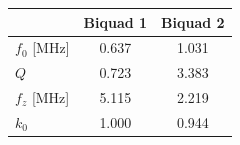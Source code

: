 \begin{tabular}{lcc}
\toprule
 & Biquad 1 & Biquad 2 \\
\midrule
$f_0$ [MHz] & 0.637 & 1.031 \\
$Q$ & 0.723 & 3.383 \\
$f_z$ [MHz] & 5.115 & 2.219 \\
$k_0$ & 1.000 & 0.944 \\
\bottomrule
\end{tabular}